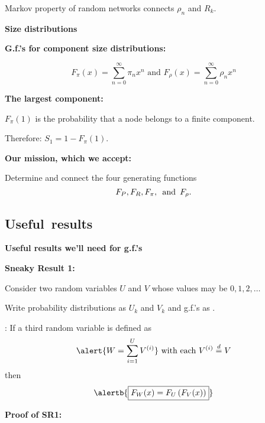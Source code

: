 \begin{frame}[label=]
\begin{frame}[label=]
\begin{frame}[label=]
\begin{frame}[label=]
\begin{frame}[label=]
\begin{frame}[label=]
\begin{frame}[label=]
\begin{frame}[label=]
\begin{frame}[label=]
\begin{frame}[label=]
\begin{frame}[label=]
    Markov property of random networks connects $\rho_n$ and $R_k$.
  


  \textbf{Size distributions}
  
  \textbf{G.f.'s for component size distributions:}
    
    
      $$ 
      F_{\pi}(x) = \sum_{n=0}^{\infty} \pi_n x^n 
      \mbox{\ and \ }
      F_{\rho}(x) = \sum_{n=0}^{\infty} \rho_n x^n $$
    
  

  \textbf{The largest component:}
    
    
       $F_\pi(1)$ is the probability
      that a node belongs to a \alert{finite} component.
    
      Therefore: $S_1 = 1 - F_\pi(1)$.
    
  
  \textbf{Our mission, which we accept:}
    
    
      Determine and connect the four generating functions
      $$
      F_P,
      F_R,
      F_\pi,
      \mbox{\, and\, }
      F_\rho.
      $$
    
  

\subsection{Useful\ results}

\begin{frame}[label=rn-sneakyresult1]
  \textbf{Useful results we'll need for g.f.'s}
  
  \textbf{Sneaky Result 1:}
    
     
      Consider two random variables 
      \alert{$U$} and \alert{$V$} whose
      values may be $0,1,2,\ldots$
     
      Write probability
      distributions as \alert{$U_k$ and $V_k$}
      and g.f.'s as .
    
      : If a third random variable is defined as
      $$
      \alert{W = \sum_{i=1}^{U} V^{(i)}}
      \
      \mbox{with each}
      \
      V^{(i)}
      \stackrel{d}{=}
      V
      $$
      {
      then
      $$
      \alertb{
        \boxed{
          F_{W}(x) 
          = 
          F_{U} 
          \left(
            F_{V}(x)
          \right)
        }
      }
      $$
    }
    
    
  

\begin{frame}[label=]
  \textbf{Proof of SR1:}


\end{frame}
\end{frame}
\end{frame}
\end{frame}
\end{frame}
\end{frame}
\end{frame}
\end{frame}
\end{frame}
\end{frame}
\end{frame}
\end{frame}
\end{frame}
